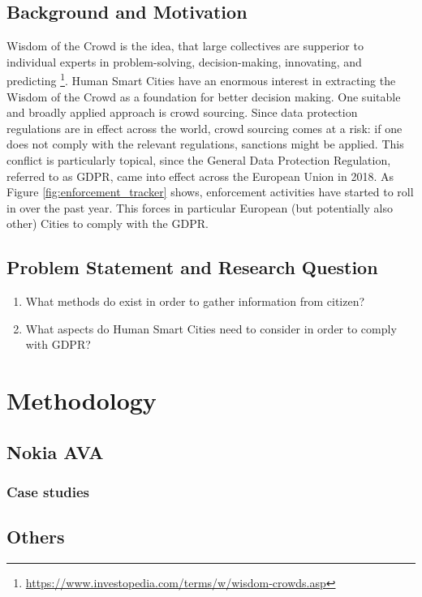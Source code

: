 \documentclass[a4paper,12pt]{report}
\begin{document}
		\section{Background and Motivation}
		\startsection
			Wisdom of the Crowd is the idea, that large collectives are supperior to individual experts in problem-solving, decision-making, innovating, and predicting \footnote{\url{https://www.investopedia.com/terms/w/wisdom-crowds.asp}}. 
			Human Smart Cities have an enormous interest in extracting the Wisdom of the Crowd as a foundation for better decision making.
			One suitable and broadly applied approach is crowd sourcing.
			Since data protection regulations are in effect across the world, crowd sourcing comes at a risk: if one does not comply with the relevant regulations, sanctions might be applied.
			This conflict is particularly topical, since the General Data Protection Regulation, referred to as GDPR, came into effect across the European Union in 2018.
			As Figure \ref{fig:enforcement_tracker} shows, enforcement activities have started to roll in over the past year. This forces in particular European (but potentially also other) Cities to comply with the GDPR.
		\closesection

		\section{Problem Statement and Research Question}
		\startsection
			\begin{enumerate}
				\item What methods do exist in order to gather information from citizen?
				\item What aspects do Human Smart Cities need to consider in order to comply with GDPR?
			\end{enumerate}
		\closesection
	
	\chapter{Methodology}
	
	\section{Nokia AVA}
	\startsection
		\subsection{Case studies}
		\startsubsection
		\closesection
	\closesection	
	\section{Others}
	\startsection
	\closesection
\end{document}
